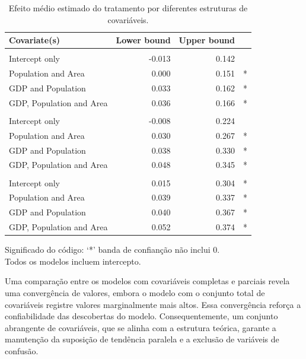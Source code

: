 \documentclass[12pt, a4paper, twoside]{article}
\numberwithin{equation}{subsection} %
\begin{document}
\hypertarget{tbl-other-models}{}
\begingroup
\fontsize{9.0pt}{10.8pt}\selectfont
\setlength{\LTpost}{0mm}
\begin{longtable}{lrrr}
\caption{\label{tbl-other-models}Efeito médio estimado do tratamento por diferentes estruturas de
covariáveis. }\tabularnewline

\toprule
Covariate(s) & Lower bound & Upper bound &   \\ 
\midrule\addlinespace[2.5pt]
\multicolumn{4}{l}{Group} \\[2.5pt] 
\midrule\addlinespace[2.5pt]
Intercept only & -0.013 & 0.142 &  \\ 
Population and Area & 0.000 & 0.151 & * \\ 
GDP and Population & 0.033 & 0.162 & * \\ 
GDP, Population and Area & 0.036 & 0.166 & * \\ 
\midrule\addlinespace[2.5pt]
\multicolumn{4}{l}{Dynamic} \\[2.5pt] 
\midrule\addlinespace[2.5pt]
Intercept only & -0.008 & 0.224 &  \\ 
Population and Area & 0.030 & 0.267 & * \\ 
GDP and Population & 0.038 & 0.330 & * \\ 
GDP, Population and Area & 0.048 & 0.345 & * \\ 
\midrule\addlinespace[2.5pt]
\multicolumn{4}{l}{Calendar-time} \\[2.5pt] 
\midrule\addlinespace[2.5pt]
Intercept only & 0.015 & 0.304 & * \\ 
Population and Area & 0.039 & 0.337 & * \\ 
GDP and Population & 0.040 & 0.367 & * \\ 
GDP, Population and Area & 0.052 & 0.374 & * \\ 
\bottomrule
\end{longtable}
\begin{minipage}{\linewidth}
Significado do código: `*' banda de confianção não inclui 0.\\
Todos os modelos incluem intercepto.\\
\end{minipage}
\endgroup

Uma comparação entre os modelos com covariáveis
\hspace{0pt}\hspace{0pt}completas e parciais revela uma convergência de
valores, embora o modelo com o conjunto total de covariáveis
\hspace{0pt}\hspace{0pt}registre valores marginalmente mais altos. Essa
convergência reforça a confiabilidade das descobertas do modelo.
Consequentemente, um conjunto abrangente de covariáveis, que se alinha
com a estrutura teórica, garante a manutenção da suposição de tendência
paralela e a exclusão de variáveis \hspace{0pt}\hspace{0pt}de confusão.
\end{document}
